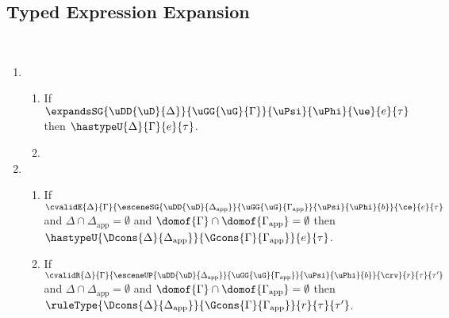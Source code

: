 \subsection{Typed Expression Expansion}\label{appendix:SES-typed-expression-expansion-metatheory}
\begin{theorem}\label{thm:typed-expansion-full-U} ~
\begin{enumerate}
  \item \begin{enumerate}
    \item If $\expandsSG{\uDD{\uD}{\Delta}}{\uGG{\uG}{\Gamma}}{\uPsi}{\uPhi}{\ue}{e}{\tau}$ then $\hastypeU{\Delta}{\Gamma}{e}{\tau}$.
    \item {}
  \end{enumerate}
  \item \begin{enumerate}
    \item If $\cvalidE{\Delta}{\Gamma}{\esceneSG{\uDD{\uD}{\Delta_\text{app}}}{\uGG{\uG}{\Gamma_\text{app}}}{\uPsi}{\uPhi}{b}}{\ce}{e}{\tau}$ and $\Delta \cap \Delta_\text{app}=\emptyset$ and $\domof{\Gamma} \cap \domof{\Gamma_\text{app}}=\emptyset$ then $\hastypeU{\Dcons{\Delta}{\Delta_\text{app}}}{\Gcons{\Gamma}{\Gamma_\text{app}}}{e}{\tau}$. 
    \item \begin{grayparbox}If $\cvalidR{\Delta}{\Gamma}{\esceneUP{\uDD{\uD}{\Delta_\text{app}}}{\uGG{\uG}{\Gamma_\text{app}}}{\uPsi}{\uPhi}{b}}{\crv}{r}{\tau}{\tau'}$ and $\Delta \cap \Delta_\text{app}=\emptyset$ and $\domof{\Gamma} \cap \domof{\Gamma_\text{app}}=\emptyset$ then $\ruleType{\Dcons{\Delta}{\Delta_\text{app}}}{\Gcons{\Gamma}{\Gamma_\text{app}}}{r}{\tau}{\tau'}$.\end{grayparbox}
  \end{enumerate}
\end{enumerate}
\end{theorem}
